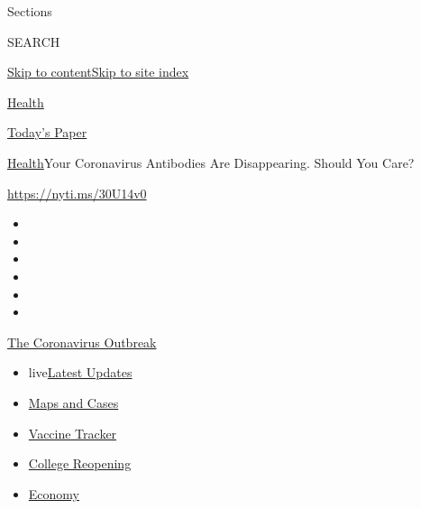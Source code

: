 Sections

SEARCH

\protect\hyperlink{site-content}{Skip to
content}\protect\hyperlink{site-index}{Skip to site index}

\href{https://www.nytimes.com/section/health}{Health}

\href{https://myaccount.nytimes.com/auth/login?response_type=cookie\&client_id=vi}{}

\href{https://www.nytimes.com/section/todayspaper}{Today's Paper}

\href{/section/health}{Health}\textbar{}Your Coronavirus Antibodies Are
Disappearing. Should You Care?

\url{https://nyti.ms/30U14v0}

\begin{itemize}
\item
\item
\item
\item
\item
\item
\end{itemize}

\href{https://www.nytimes.com/news-event/coronavirus?action=click\&pgtype=Article\&state=default\&region=TOP_BANNER\&context=storylines_menu}{The
Coronavirus Outbreak}

\begin{itemize}
\tightlist
\item
  live\href{https://www.nytimes.com/2020/08/04/world/coronavirus-cases.html?action=click\&pgtype=Article\&state=default\&region=TOP_BANNER\&context=storylines_menu}{Latest
  Updates}
\item
  \href{https://www.nytimes.com/interactive/2020/us/coronavirus-us-cases.html?action=click\&pgtype=Article\&state=default\&region=TOP_BANNER\&context=storylines_menu}{Maps
  and Cases}
\item
  \href{https://www.nytimes.com/interactive/2020/science/coronavirus-vaccine-tracker.html?action=click\&pgtype=Article\&state=default\&region=TOP_BANNER\&context=storylines_menu}{Vaccine
  Tracker}
\item
  \href{https://www.nytimes.com/2020/08/02/us/covid-college-reopening.html?action=click\&pgtype=Article\&state=default\&region=TOP_BANNER\&context=storylines_menu}{College
  Reopening}
\item
  \href{https://www.nytimes.com/live/2020/08/04/business/stock-market-today-coronavirus?action=click\&pgtype=Article\&state=default\&region=TOP_BANNER\&context=storylines_menu}{Economy}
\end{itemize}

